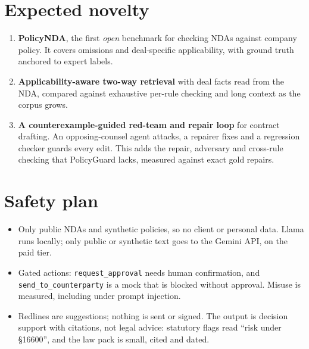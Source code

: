 \documentclass[11pt,a4paper]{article}
\begin{document}
\section{Expected novelty}
\begin{enumerate}
\item \textbf{PolicyNDA}, the first \emph{open} benchmark for checking NDAs against company policy. It covers omissions and deal-specific applicability, with ground truth anchored to expert labels.
\item \textbf{Applicability-aware two-way retrieval} with deal facts read from the NDA, compared against exhaustive per-rule checking and long context as the corpus grows.
\item \textbf{A counterexample-guided red-team and repair loop} for contract drafting. An opposing-counsel agent attacks, a repairer fixes and a regression checker guards every edit. This adds the repair, adversary and cross-rule checking that PolicyGuard lacks, measured against exact gold repairs.
\end{enumerate}

\section{Safety plan}
\begin{itemize}
\item Only public NDAs and synthetic policies, so no client or personal data. Llama runs locally; only public or synthetic text goes to the Gemini API, on the paid tier.
\item Gated actions: \texttt{request\_approval} needs human confirmation, and \texttt{send\_to\_counterparty} is a mock that is blocked without approval. Misuse is measured, including under prompt injection.
\item Redlines are suggestions; nothing is sent or signed. The output is decision support with citations, not legal advice: statutory flags read ``risk under \S16600'', and the law pack is small, cited and dated.
\end{itemize}

\end{document}
